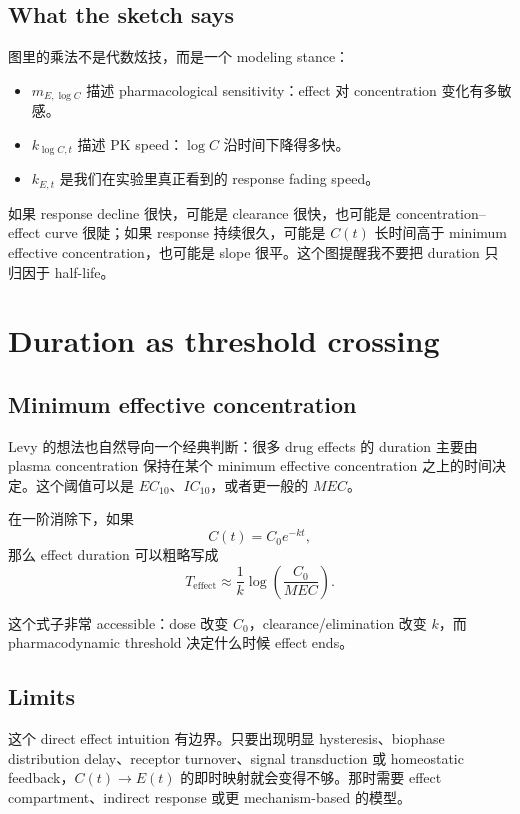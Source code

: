 \documentclass[a4paper]{article}
\begin{document}
\subsection{What the sketch says}

图里的乘法不是代数炫技，而是一个 modeling stance：

\begin{itemize}[leftmargin=2em]
  \item \(m_{E,\log C}\) 描述 pharmacological sensitivity：effect 对 concentration 变化有多敏感。
  \item \(k_{\log C,t}\) 描述 PK speed：\(\log C\) 沿时间下降得多快。
  \item \(k_{E,t}\) 是我们在实验里真正看到的 response fading speed。
\end{itemize}

如果 response decline 很快，可能是 clearance 很快，也可能是 concentration--effect curve 很陡；如果 response 持续很久，可能是 \(C(t)\) 长时间高于 minimum effective concentration，也可能是 slope 很平。这个图提醒我不要把 duration 只归因于 half-life。

\section{Duration as threshold crossing}

\subsection{Minimum effective concentration}

Levy 的想法也自然导向一个经典判断：很多 drug effects 的 duration 主要由 plasma concentration 保持在某个 minimum effective concentration 之上的时间决定。这个阈值可以是 \(\textit{EC}_{10}\)、\(\textit{IC}_{10}\)，或者更一般的 \(\textit{MEC}\)。

在一阶消除下，如果
\[
  C(t)=C_0e^{-kt},
\]
那么 effect duration 可以粗略写成
\[
  T_{\mathrm{effect}}
  \approx
  \frac{1}{k}\log\!\left(\frac{C_0}{\textit{MEC}}\right).
\]

这个式子非常 accessible：dose 改变 \(C_0\)，clearance/elimination 改变 \(k\)，而 pharmacodynamic threshold 决定什么时候 effect ends。

\subsection{Limits}

这个 direct effect intuition 有边界。只要出现明显 hysteresis、biophase distribution delay、receptor turnover、signal transduction 或 homeostatic feedback，\(C(t)\rightarrow E(t)\) 的即时映射就会变得不够。那时需要 effect compartment、indirect response 或更 mechanism-based 的模型。
\end{document}
